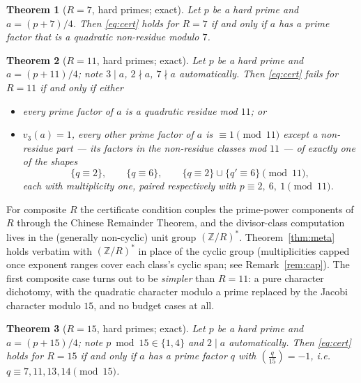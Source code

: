 \documentclass[11pt]{article}
\theoremstyle{plain}
\newtheorem{theorem}{Theorem}[section]
\theoremstyle{remark}
\theoremstyle{plain}
\numberwithin{equation}{section}
\newcommand{\legendre}[2]{\genfrac{(}{)}{}{1}{#1}{#2}}
\begin{document}
\begin{theorem}[$R=7$, hard primes; exact]\label{thm:Ap}
Let $p$ be a hard prime and $a = (p+7)/4$. Then \eqref{eq:cert} holds for
$R = 7$ if and only if $a$ has a prime factor that is a quadratic
non-residue modulo $7$.
\end{theorem}

\begin{theorem}[$R=11$, hard primes; exact]\label{thm:App}
Let $p$ be a hard prime and $a = (p+11)/4$; note $3 \mid a$, $2 \nmid a$,
$7 \nmid a$ automatically. Then \eqref{eq:cert} \emph{fails} for $R = 11$
if and only if either
\begin{itemize}
\item[(a)] every prime factor of $a$ is a quadratic residue mod $11$; or
\item[(b)] $v_3(a) = 1$, every other prime factor of $a$ is
  $\equiv 1 \pmod{11}$ except a \emph{non-residue part} --- its factors
  in the non-residue classes mod $11$ --- of exactly one of the
  shapes
  \[
    \{q \equiv 2\}, \qquad \{q \equiv 6\}, \qquad
    \{q \equiv 2\} \cup \{q' \equiv 6\} \pmod{11},
  \]
  each with multiplicity one, paired respectively with
  $p \equiv 2,\ 6,\ 1 \pmod{11}$.
\end{itemize}
\end{theorem}

For composite $R$ the certificate condition couples the prime-power
components of $R$ through the Chinese Remainder Theorem, and the
divisor-class computation lives in the (generally non-cyclic) unit
group $(\mathbb{Z}/R)^*$. Theorem~\ref{thm:meta} holds verbatim with
$(\mathbb{Z}/R)^*$ in place of the cyclic group (multiplicities capped
once exponent ranges cover each class's cyclic span; see
Remark~\ref{rem:cap}). The first composite case turns out to be
\emph{simpler} than $R = 11$: a pure character dichotomy, with the
quadratic character modulo a prime replaced by the Jacobi character
modulo $15$, and no budget cases at all.

\begin{theorem}[$R=15$, hard primes; exact]\label{thm:R15}
Let $p$ be a hard prime and $a = (p+15)/4$; note $p \bmod 15 \in
\{1, 4\}$ and $2 \mid a$ automatically. Then \eqref{eq:cert} holds for
$R = 15$ if and only if $a$ has a prime factor $q$ with
$\legendre{q}{15} = -1$, i.e.\ $q \equiv 7, 11, 13, 14 \pmod{15}$.
\end{theorem}
\end{document}
